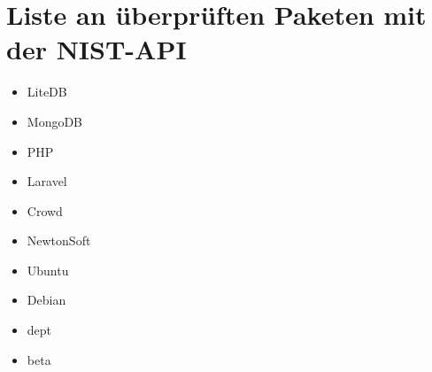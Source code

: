 \section{Liste an überprüften Paketen mit der NIST-API} \label{sec:ListOfCheckedPackages}
    \begin{itemize}
        \item LiteDB
        \item MongoDB
        \item PHP
        \item Laravel
        \item Crowd
        \item NewtonSoft
        \item Ubuntu
        \item Debian
        \item dept
        \item beta
    \end{itemize}